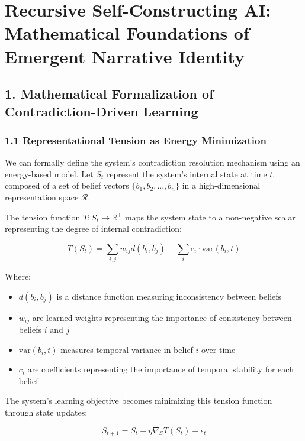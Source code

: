 \documentclass[
]{article}
\providecommand{\tightlist}{%
  \setlength{\itemsep}{0pt}\setlength{\parskip}{0pt}}
\begin{document}
\section{Recursive Self-Constructing AI: Mathematical Foundations of
Emergent Narrative Identity}\label{3-internal-contradictions-theory}

\subsection{1. Mathematical Formalization of Contradiction-Driven
Learning}\label{mathematical-formalization-of-contradiction-driven-learning}

\subsubsection{1.1 Representational Tension as Energy
Minimization}\label{representational-tension-as-energy-minimization}

We can formally define the system's contradiction resolution mechanism
using an energy-based model. Let \(S_t\) represent the system's internal
state at time \(t\), composed of a set of belief vectors
\(\{b_1, b_2, ..., b_n\}\) in a high-dimensional representation space
\(\mathcal{R}\).

The tension function \(T: S_t \rightarrow \mathbb{R}^+\) maps the system
state to a non-negative scalar representing the degree of internal
contradiction:

\[T(S_t) = \sum_{i,j} w_{ij}d(b_i, b_j) + \sum_i c_i \cdot \text{var}(b_i, t)\]

Where:

\begin{itemize}
\tightlist
\item
  \(d(b_i, b_j)\) is a distance function measuring inconsistency between
  beliefs
\item
  \(w_{ij}\) are learned weights representing the importance of
  consistency between beliefs \(i\) and \(j\)
\item
  \(\text{var}(b_i, t)\) measures temporal variance in belief \(i\) over
  time
\item
  \(c_i\) are coefficients representing the importance of temporal
  stability for each belief
\end{itemize}

The system's learning objective becomes minimizing this tension function
through state updates:

\[S_{t+1} = S_t - \eta \nabla_S T(S_t) + \epsilon_t\]
\end{document}
